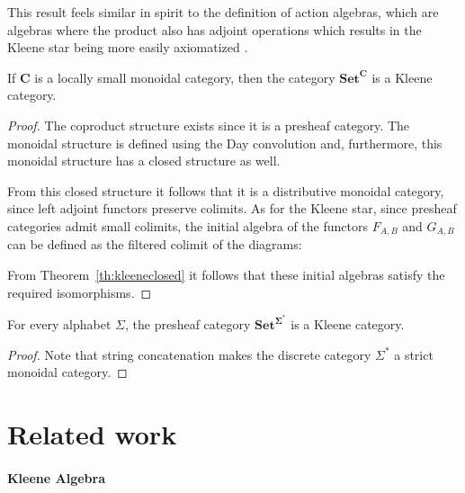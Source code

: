 \documentclass[sigconf,anonymous,review,screen]{acmart}
\newcommand{\cat}[1]{\mathbf{#1}}
\begin{document}
This result feels similar in spirit to the definition of action
algebras, which are algebras where the product also has adjoint
operations which results in the Kleene star being more easily
axiomatized \cite{kozen1994}.


\begin{theorem}
  If $\cat{C}$ is a locally small monoidal category, then the category
  $\cat{Set}^{\cat{C}}$ is a Kleene category.
\end{theorem}
\begin{proof}
  The coproduct structure exists since it is a presheaf category. The
  monoidal structure is defined using the Day convolution and,
  furthermore, this monoidal structure has a closed structure as well.
  
  From this closed structure it follows that it is a distributive
  monoidal category, since left adjoint functors preserve colimits. As
  for the Kleene star, since presheaf categories admit small colimits,
  the initial algebra of the functors $F_{A,B}$ and $G_{A,B}$ can be
  defined as the filtered colimit of the diagrams:

  From Theorem~\ref{th:kleeneclosed} it follows that
  these initial algebras satisfy the required isomorphisms.
\end{proof}

\begin{corollary}
  For every alphabet $\Sigma$, the presheaf category $\cat{Set}^{\cat{\Sigma^*}}$
  is a Kleene category.
\end{corollary}
\begin{proof}
  Note that string concatenation makes the discrete category
  $\Sigma^*$ a strict monoidal category.
\end{proof}

\section{Related work}

\paragraph{Kleene Algebra}
\end{document}
